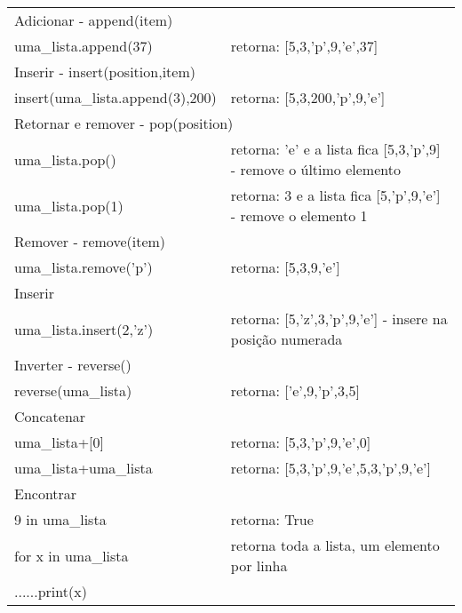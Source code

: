 \documentclass[landscape,a0paper,fontscale=0.285]{baposter} %
\begin{document}
\begin{poster}
{\begin{tabular}{@{}ll@{}}
\multicolumn{2}{l}{\cellcolor[HTML]{DDFFFF}Adicionar - append(item)} \\
uma\_lista.append(37) & retorna: [5,3,'p',9,'e',37] \\
\multicolumn{2}{l}{\cellcolor[HTML]{DDFFFF}Inserir - insert(position,item)} \\
insert(uma\_lista.append(3),200) & retorna: [5,3,200,'p',9,'e'] \\
\multicolumn{2}{l}{\cellcolor[HTML]{DDFFFF}Retornar e remover - pop(position)} \\
uma\_lista.pop() & retorna: 'e' e a lista fica [5,3,'p',9] - remove o último elemento \\
uma\_lista.pop(1) & retorna: 3 e a lista fica [5,'p',9,'e'] - remove o elemento 1 \\
\multicolumn{2}{l}{\cellcolor[HTML]{DDFFFF}Remover - remove(item)} \\
uma\_lista.remove('p') & retorna: [5,3,9,'e'] \\
\multicolumn{2}{l}{\cellcolor[HTML]{DDFFFF}Inserir} \\
uma\_lista.insert(2,'z') & retorna: [5,'z',3,'p',9,'e'] - insere na posição numerada \\
\multicolumn{2}{l}{\cellcolor[HTML]{DDFFFF}Inverter - reverse()} \\
reverse(uma\_lista) & retorna: ['e',9,'p',3,5] \\
\multicolumn{2}{l}{\cellcolor[HTML]{DDFFFF}Concatenar} \\
uma\_lista+[0] & retorna: [5,3,'p',9,'e',0] \\
uma\_lista+uma\_lista & retorna: [5,3,'p',9,'e',5,3,'p',9,'e'] \\
\multicolumn{2}{l}{\cellcolor[HTML]{DDFFFF}Encontrar} \\
9 in uma\_lista & retorna: True \\
for x in uma\_lista & retorna toda a lista, um elemento por linha \\
......print(x) &  
\end{tabular}
}
\end{poster}
\newpage

\end{document}
